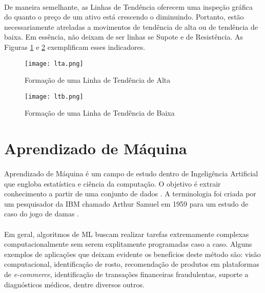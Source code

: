 \paragraph{} De maneira semelhante, as Linhas de Tendência oferecem uma inspeção gráfica do quanto o preço de um ativo está crescendo o diminuindo. Portanto, estão necessariamente atreladas a movimentos de tendência de alta ou de tendência de baixa. Em essência, não deixam de ser linhas se Supote e de Resistência. As Figuras \ref{fig:4} e \ref{fig:5} exemplificam esses indicadores.

\begin{figure}[h]
    \texttt{[image: lta.png]}
    \centering
    \caption{Formação de uma Linha de Tendência de Alta \cite{moraes2007se}}
    \label{fig:4}
\end{figure}

\begin{figure}[h]
    \texttt{[image: ltb.png]}
    \centering
    \caption{Formação de uma Linha de Tendência de Baixa \cite{moraes2007se}}
    \label{fig:5}
\end{figure}



\FloatBarrier
\section{Aprendizado de Máquina}

\paragraph{} Aprendizado de Máquina é um campo de estudo dentro de Ingeligência Artificial \cite{ibm_ai} que engloba estatística e ciência da computação. O objetivo é extrair conhecimento a partir de uma conjunto de dados \cite{muller2016introduction}. A terminologia foi criada por um pesquisador da IBM chamado Arthur Samuel em 1959 \cite{ibm_ml} para um estudo de caso do jogo de damas \cite{arthur1959some}.

\paragraph{} Em geral, algoritmos de ML buscam realizar tarefas extremamente complexas computacionalmente sem serem explitamente programadas caso a caso. Alguns exemplos de aplicações que deixam evidente os benefícios deste método são: visão computacional, identificação de rosto, recomendação de produtos em plataformas de \textit{e-commerce}, identificação de transações financeiras fraudulentas, suporte a diagnósticos médicos, dentre diversos outros.

